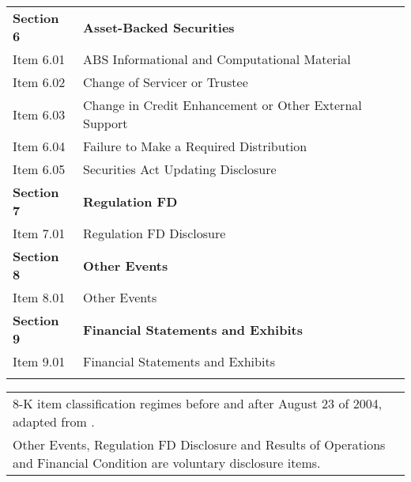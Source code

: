 \begin{table}[H]
\begin{small}
\begin{tabular}{ll}
    \textbf{Section 6} & \textbf{Asset-Backed Securities} \\
    Item 6.01 & ABS Informational and Computational Material \\
    Item 6.02 & Change of Servicer or Trustee \\
    Item 6.03 & Change in Credit Enhancement or Other External Support \\
    Item 6.04 & Failure to Make a Required Distribution \\
    Item 6.05 & Securities Act Updating Disclosure \\
    \textbf{Section 7} & \textbf{Regulation FD} \\
    Item 7.01 & Regulation FD Disclosure \\
    \textbf{Section 8} & \textbf{Other Events} \\
    Item 8.01 & Other Events \\
    \textbf{Section 9} & \textbf{Financial Statements and Exhibits} \\
    Item 9.01 & Financial Statements and Exhibits \\
              & 
    \end{tabular}%

\begin{tabular}{l}
8-K item classification regimes before and after August 23 of 2004, adapted from \cite{secFinalRuleAdditional2004}. \\
Other Events, Regulation FD Disclosure and Results of Operations and Financial Condition are voluntary disclosure items.
\end{tabular}
\end{small}
\end{table}%
